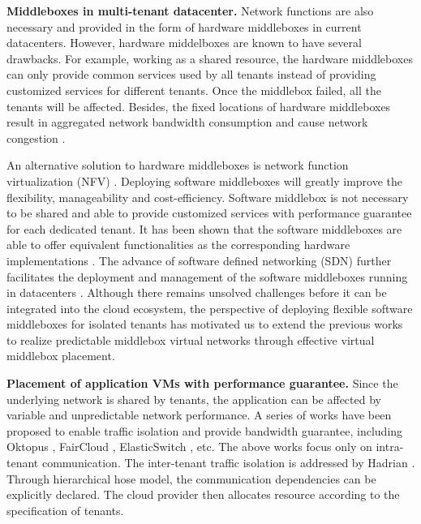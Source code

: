\documentclass[review]{elsarticle}
\begin{document}
\textbf{Middleboxes in multi-tenant datacenter. }
Network functions are also necessary and provided in the form of hardware middleboxes in current datacenters.  However, hardware middelboxes are known to have several drawbacks. For example, working as a shared resource, the hardware middleboxes can only provide common services used by all tenants instead of providing customized services for different tenants. Once the middlebox failed, all the tenants will be affected. Besides, the fixed locations of hardware middleboxes result in aggregated network bandwidth consumption and cause network congestion \cite{ClickOS, Y15NFV}. 

An alternative solution to hardware middleboxes is network function virtualization (NFV) \cite{NFV}. Deploying software middleboxes will greatly improve the flexibility, manageability and cost-efficiency. Software middlebox is not necessary to be shared and able to provide customized services with performance guarantee for each dedicated tenant. It has been shown that the software middleboxes are able to offer equivalent functionalities as the corresponding hardware implementations \cite{D12tpp, S12dai, G13dio, ClickOS}. The advance of software defined networking (SDN) further facilitates the deployment and management of the software middleboxes running in datacenters \cite{benzekki2016software, qazi2013simple, anwer2013slick, gember2014opennf}. Although there remains unsolved challenges before it can be integrated into the cloud ecosystem, the perspective of deploying flexible software middleboxes for isolated tenants has motivated us to extend the previous works to realize predictable middlebox virtual networks through effective virtual middlebox placement.


\textbf{Placement of application VMs with performance guarantee.}
Since the underlying network is shared by tenants, the application can be affected by variable and unpredictable network performance. A series of works have been proposed to enable traffic isolation and provide bandwidth guarantee, including Oktopus \cite{B11tpd}, FairCloud \cite{P12fst}, ElasticSwitch \cite{elasticswitch}, etc. The above works focus only on intra-tenant communication. The inter-tenant traffic isolation is addressed by Hadrian \cite{B13cta}. Through hierarchical hose model, the communication dependencies can be explicitly declared. The cloud provider then allocates resource according to the specification of tenants. 
\end{document}
